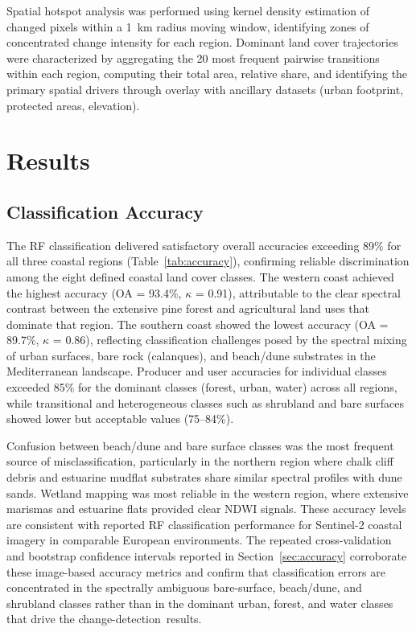\documentclass[coasts,article,accept,pdftex,moreauthors]{Definitions/mdpi}
\begin{document}
Spatial hotspot analysis was performed using kernel density estimation of changed pixels within a 1~km radius moving window, identifying zones of concentrated change intensity for each region. Dominant land cover trajectories were characterized by aggregating the 20 most frequent pairwise transitions within each region, computing their total area, relative share, and identifying the primary spatial drivers through overlay with ancillary datasets (urban footprint, protected areas, elevation).

\section{Results}

\subsection{Classification Accuracy}

The RF classification delivered satisfactory overall accuracies exceeding 89\% for all three coastal regions (Table~\ref{tab:accuracy}), confirming reliable discrimination among the eight defined coastal land cover classes. The western coast achieved the highest accuracy (OA = 93.4\%, $\kappa$ = 0.91), attributable to the clear spectral contrast between the extensive pine forest and agricultural land uses that dominate that region. The southern coast showed the lowest accuracy (OA = 89.7\%, $\kappa$ = 0.86), reflecting classification challenges posed by the spectral mixing of urban surfaces, bare rock (calanques), and beach/dune substrates in the Mediterranean landscape. Producer and user accuracies for individual classes exceeded 85\% for the dominant classes (forest, urban, water) across all regions, while transitional and heterogeneous classes such as shrubland and bare surfaces showed lower but acceptable values (75--84\%).

Confusion between beach/dune and bare surface classes was the most frequent source of misclassification, particularly in the northern region where chalk cliff debris and estuarine mudflat substrates share similar spectral profiles with dune sands. Wetland mapping was most reliable in the western region, where extensive marismas and estuarine flats provided clear NDWI signals. These accuracy levels are consistent with reported RF classification performance for Sentinel-2 coastal imagery in comparable European environments. {The repeated cross-validation and bootstrap confidence intervals reported in Section~\ref{sec:accuracy} corroborate these image-based accuracy metrics and confirm that classification errors are concentrated in the spectrally ambiguous bare-surface, beach/dune, and shrubland classes rather than in the dominant urban, forest, and water classes that drive the change-detection~results.}
\end{document}
